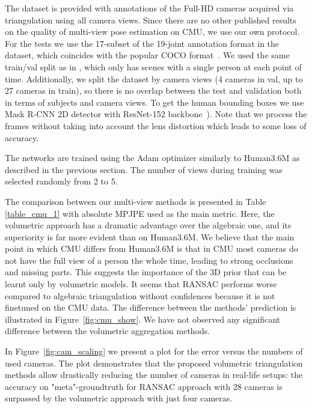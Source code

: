 \documentclass[10pt,twocolumn,letterpaper]{article}
\newcommand{\fig}[1]{Figure~\ref{fig:#1}}
\begin{document}
The dataset is provided with annotations of the Full-HD cameras acquired via triangulation using all camera views. Since there are no other published results on the quality of multi-view pose estimation on CMU, we use our own protocol. For the tests we use the 17-subset of the 19-joint annotation format in the dataset, which coincides with the popular COCO format~\cite{lin2014microsoft}. We used the same train/val split as in \cite{xiang2018monocular}, which only has scenes with a single person at each point of time. Additionally, we split the dataset by camera views (4 cameras in val, up to 27 cameras in train), so there is no overlap between the test and validation both in terms of subjects and camera views. To get the human bounding boxes we use Mask R-CNN 2D detector with ResNet-152 backbone~\cite{massa2018mrcnn}). Note that we process the frames without taking into account the lens distortion which leads to some loss of accuracy. 

The networks are trained using the Adam optimizer similarly to Human3.6M as described in the previous section. The number of views during training was selected randomly from 2 to 5.

The comparison between our multi-view methods is presented in Table \ref{table_cmu_1} with absolute MPJPE used as the main metric. Here, the volumetric approach has a dramatic advantage over the algebraic one, and its superiority is far more evident than on Human3.6M. We believe that the main point in which CMU differs from Human3.6M is that in CMU most cameras do not have the full view of a person the whole time, leading to strong occlusions and missing parts. This suggests the importance of the 3D prior that can be learnt only by volumetric models. It seems that RANSAC performs worse compared to algebraic triangulation without confidences because it is not finetuned on the CMU data. The difference between the methods' prediction is illustrated in \fig{cmu_show}. We have not observed any significant difference between the volumetric aggregation methods.

In \fig{cam_scaling} we present a plot for the error versus the numbers of used cameras. The plot demonstrates that the proposed volumetric triangulation methods allow drastically reducing the number of cameras in real-life setups: the accuracy on "meta"-groundtruth for RANSAC approach with 28 cameras is surpassed by the volumetric approach with just four cameras.
\end{document}
